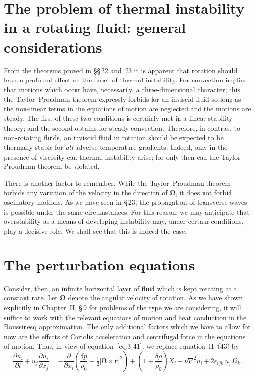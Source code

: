 \section{The problem of thermal instability in a rotating fluid: general considerations}\label{sec:3-24}
From the theorems proved in \S\S\,22 and~23 it is apparent that rotation should have a profound effect on the onset of thermal instability. For convection implies that motions which occur have, necessarily, a three-dimensional character; this the Taylor--Proudman theorem expressly forbids for an inviscid fluid so long as the non-linear terms in the equations of motion are neglected and the motions are steady. The first of these two conditions is certainly met in a linear stability theory; and the second obtains for steady convection. Therefore, in contrast to non-rotating fluids, an inviscid fluid in rotation should be expected to be thermally stable for \emph{all} adverse temperature gradients. Indeed, only in the presence of viscosity can thermal instability arise; for only then can the Taylor--Proudman theorem be violated.

There is another factor to remember. While the Taylor--Proudman theorem forbids any variation of the velocity in the direction of $\boldsymbol{\Omega}$, it does not forbid oscillatory motions. As we have seen in \S\,23, the propagation of transverse waves is possible under the same circumstances. For this reason, we may anticipate that overstability as a means of developing instability may, under certain conditions, play a decisive role. We shall see that this is indeed the case.

\section{The perturbation equations}\label{sec:3-25}
Consider, then, an infinite horizontal layer of fluid which is kept rotating at a constant rate. Let $\boldsymbol{\Omega}$ denote the angular velocity of rotation. As we have shown explicitly in Chapter~II, \S\,9 for problems of the type we are considering, it will suffice to work with the relevant equations of motion and heat conduction in the Boussinesq approximation. The only additional factors which we have to allow for now are the effects of Coriolis acceleration and centrifugal force in the equations of motion. Thus, in view of equation~\eqref{eq:3-41}, we replace equation~II~(43) by
\begin{equation}\label{eq:3-77}
\frac{\partial u_i}{\partial t} + u_j\frac{\partial u_i}{\partial x_j} = -\frac{\partial}{\partial x_i}\!\left(\frac{\delta p}{\rho_0} - \tfrac{1}{2}|\boldsymbol{\Omega}\times\mathbf{r}|^2\right) + \left(1+\frac{\delta\rho}{\rho_0}\right)X_i + \nu\nabla^2 u_i + 2\epsilon_{ijk}\, u_j\,\Omega_k.
\end{equation}


